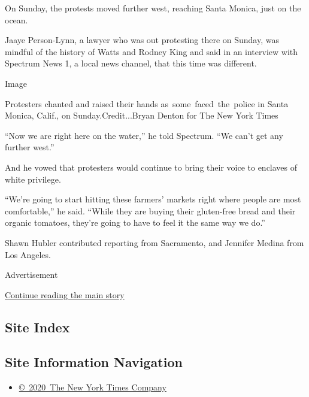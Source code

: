 On Sunday, the protests moved further west, reaching Santa Monica, just
on the ocean.

Jaaye Person-Lynn, a lawyer who was out protesting there on Sunday, was
mindful of the history of Watts and Rodney King and said in an interview
with Spectrum News 1, a local news channel, that this time was
different.

Image

Protesters chanted and raised their hands as~some~faced~the~police in
Santa Monica, Calif., on Sunday.Credit...Bryan Denton for The New York
Times

``Now we are right here on the water,'' he told Spectrum. ``We can't get
any further west.''

And he vowed that protesters would continue to bring their voice to
enclaves of white privilege.

``We're going to start hitting these farmers' markets right where people
are most comfortable,'' he said. ``While they are buying their
gluten-free bread and their organic tomatoes, they're going to have to
feel it the same way we do.''

Shawn Hubler contributed reporting from Sacramento, and Jennifer Medina
from Los Angeles.

Advertisement

\protect\hyperlink{after-bottom}{Continue reading the main story}

\hypertarget{site-index}{%
\subsection{Site Index}\label{site-index}}

\hypertarget{site-information-navigation}{%
\subsection{Site Information
Navigation}\label{site-information-navigation}}

\begin{itemize}
\tightlist
\item
  \href{https://help.nytimes3xbfgragh.onion/hc/en-us/articles/115014792127-Copyright-notice}{©~2020~The
  New York Times Company}
\end{itemize}

